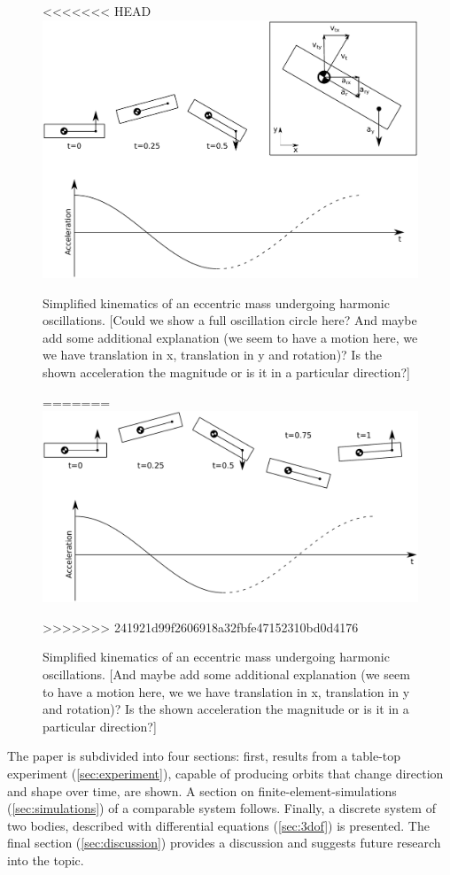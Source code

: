 \documentclass{article}
\begin{document}
\begin{figure}[ht!]
    \centering
<<<<<<< HEAD
    \includegraphics[width=0.7\linewidth]{figures/kinematics.pdf}
    \caption{Simplified kinematics of an eccentric mass undergoing harmonic oscillations. [Could we show a full oscillation circle here? And maybe add some additional explanation (we seem to have a motion here, we we have translation in x, translation in y and rotation)? Is the shown acceleration the magnitude or is it in a particular direction?]}
=======
    \includegraphics[width=0.7\linewidth]{figures/kinematics_2.pdf}
    \caption{Simplified kinematics of an eccentric mass undergoing harmonic oscillations. [And maybe add some additional explanation (we seem to have a motion here, we we have translation in x, translation in y and rotation)? Is the shown acceleration the magnitude or is it in a particular direction?]}
>>>>>>> 241921d99f2606918a32fbfe47152310bd0d4176
    \label{fig:kinematics}
\end{figure}

The paper is subdivided into four sections: first, results from a table-top experiment (\autoref{sec:experiment}), capable of producing orbits that change direction and shape over time, are shown. A section on finite-element-simulations (\autoref{sec:simulations}) of a comparable system follows. Finally, a discrete system of two bodies, described with differential equations (\autoref{sec:3dof}) is presented. The final section (\autoref{sec:discussion}) provides a discussion and suggests future research into the topic. 
\end{document}
